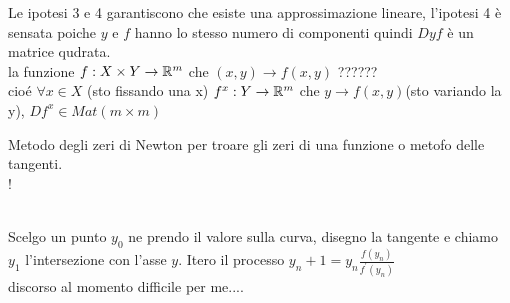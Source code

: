 \observation
Le ipotesi 3 e 4 garantiscono che esiste una approssimazione lineare, l'ipotesi 4 è sensata poiche $y$ e $f$ hanno lo stesso numero di componenti quindi $Dyf$ è un matrice qudrata.\\
la funzione $f:X\times Y\rightarrow \mathbb{R}^m$ che $(x,y)\rightarrow f(x,y)$ ??????\\
cio\'e $\forall x\in X$ (sto fissando una x) $f^x:Y\rightarrow \mathbb{R}^m$ che $y\rightarrow f(x,y)$(sto variando la y), $Df^x\in Mat(m\times m)$

\observation Metodo degli zeri di Newton per troare gli zeri di una funzione o metofo delle tangenti.\\
\resizebox {\columnwidth} {!} {
}\\
Scelgo un punto $y_0$ ne prendo il valore sulla curva, disegno la tangente e chiamo $y_1$ l'intersezione con l'asse $y$. Itero il processo $y_n+1=y_n\frac{f(y_n)}{f^{'}(y_n)}$\\
discorso al momento difficile per me....\\
